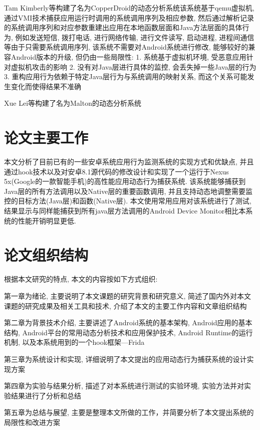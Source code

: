 Tam Kimberly等构建了名为CopperDroid的动态分析系统\juhao 该系统基于qemu虚拟机, 通过VMI技术捕获应用运行时调用的系统调用序列及相应参数, 然后通过解析记录的系统调用序列和对应参数重建出应用在本地函数层面和Java方法层面的具体行为, 例如发送短信, 拨打电话, 进行网络传输, 进行文件读写, 启动进程, 进程间通信等\juhao 由于只需要系统调用序列, 该系统不需要对Android系统进行修改, 能够较好的兼容Android版本的升级, 但仍由一些局限性:
1. 系统基于虚拟机环境, 受恶意应用针对虚拟机攻击的影响
2. 没有对Java层进行具体的监控, 会丢失掉一些Java层的行为
3. 重构应用行为依赖于特定Java层行为与系统调用的映射关系, 而这个关系可能发生变化而使得结果不准确

Xue Lei等构建了名为Malton的动态分析系统\juhao


\section{论文主要工作}
本文分析了目前已有的一些安卓系统应用行为监测系统的实现方式和优缺点, 并且通过hook技术以及对安卓8.1源代码的修改设计和实现了一个运行于Nexus 5x(Google的一款智能手机)的高性能应用动态行为捕获系统. 该系统能够捕获到Java层的所有方法调用以及Native层的重要函数调用, 并且支持动态地调整需要监控的目标方法(Java层)和函数(Native层). 本文使用常用应用对该系统进行了测试, 结果显示与同样能捕获到所有java层方法调用的Android Device Monitor相比本系统的性能开销明显更低.

\section{论文组织结构}
根据本文研究的特点, 本文的内容按如下方式组织:

第一章为绪论, 主要说明了本文课题的研究背景和研究意义, 简述了国内外对本文课题的研究成果及相关工具和技术, 介绍了本文的主要工作内容和文章组织结构\juhao 

第二章为背景技术介绍, 主要讲述了Android系统的基本架构, Android应用的基本结构, Android平台的常用动态分析技术和应用保护技术, Android Runtime的运行机制, 以及本系统用到的一个hook框架---Frida\juhao

第三章为系统设计和实现, 详细说明了本文提出的应用动态行为捕获系统的设计实现方案\juhao

第四章为实验与结果分析, 描述了对本系统进行测试的实验环境, 实验方法并对实验结果进行了分析和总结\juhao

第五章为总结与展望, 主要是整理本文所做的工作，并简要分析了本文提出系统的局限性和改进方案\juhao

 